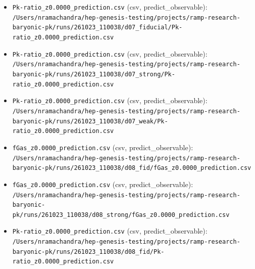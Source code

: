 \documentclass[11pt,a4paper]{article}
\begin{document}
\begin{itemize}
  \item \texttt{Pk-ratio\_\allowbreak{}z0.0000\_\allowbreak{}prediction.csv} (csv, predict\_observable): \texttt{/\allowbreak{}Users/\allowbreak{}nramachandra/\allowbreak{}hep-genesis-testing/\allowbreak{}projects/\allowbreak{}ramp-research-baryonic-pk/\allowbreak{}runs/\allowbreak{}261023\_\allowbreak{}110038/\allowbreak{}d07\_\allowbreak{}fiducial/\allowbreak{}Pk-ratio\_\allowbreak{}z0.0000\_\allowbreak{}prediction.csv}
  \item \texttt{Pk-ratio\_\allowbreak{}z0.0000\_\allowbreak{}prediction.csv} (csv, predict\_observable): \texttt{/\allowbreak{}Users/\allowbreak{}nramachandra/\allowbreak{}hep-genesis-testing/\allowbreak{}projects/\allowbreak{}ramp-research-baryonic-pk/\allowbreak{}runs/\allowbreak{}261023\_\allowbreak{}110038/\allowbreak{}d07\_\allowbreak{}strong/\allowbreak{}Pk-ratio\_\allowbreak{}z0.0000\_\allowbreak{}prediction.csv}
  \item \texttt{Pk-ratio\_\allowbreak{}z0.0000\_\allowbreak{}prediction.csv} (csv, predict\_observable): \texttt{/\allowbreak{}Users/\allowbreak{}nramachandra/\allowbreak{}hep-genesis-testing/\allowbreak{}projects/\allowbreak{}ramp-research-baryonic-pk/\allowbreak{}runs/\allowbreak{}261023\_\allowbreak{}110038/\allowbreak{}d07\_\allowbreak{}weak/\allowbreak{}Pk-ratio\_\allowbreak{}z0.0000\_\allowbreak{}prediction.csv}
  \item \texttt{fGas\_\allowbreak{}z0.0000\_\allowbreak{}prediction.csv} (csv, predict\_observable): \texttt{/\allowbreak{}Users/\allowbreak{}nramachandra/\allowbreak{}hep-genesis-testing/\allowbreak{}projects/\allowbreak{}ramp-research-baryonic-pk/\allowbreak{}runs/\allowbreak{}261023\_\allowbreak{}110038/\allowbreak{}d08\_\allowbreak{}fid/\allowbreak{}fGas\_\allowbreak{}z0.0000\_\allowbreak{}prediction.csv}
  \item \texttt{fGas\_\allowbreak{}z0.0000\_\allowbreak{}prediction.csv} (csv, predict\_observable): \texttt{/\allowbreak{}Users/\allowbreak{}nramachandra/\allowbreak{}hep-genesis-testing/\allowbreak{}projects/\allowbreak{}ramp-research-baryonic-pk/\allowbreak{}runs/\allowbreak{}261023\_\allowbreak{}110038/\allowbreak{}d08\_\allowbreak{}strong/\allowbreak{}fGas\_\allowbreak{}z0.0000\_\allowbreak{}prediction.csv}
  \item \texttt{Pk-ratio\_\allowbreak{}z0.0000\_\allowbreak{}prediction.csv} (csv, predict\_observable): \texttt{/\allowbreak{}Users/\allowbreak{}nramachandra/\allowbreak{}hep-genesis-testing/\allowbreak{}projects/\allowbreak{}ramp-research-baryonic-pk/\allowbreak{}runs/\allowbreak{}261023\_\allowbreak{}110038/\allowbreak{}d08\_\allowbreak{}fid/\allowbreak{}Pk-ratio\_\allowbreak{}z0.0000\_\allowbreak{}prediction.csv}

\end{itemize}
\end{document}
